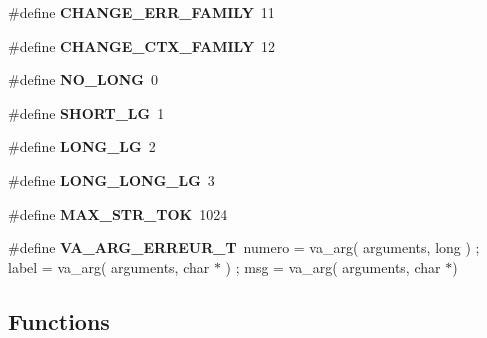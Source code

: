 \begin{CompactItemize}
\item 
\#define {\bf CHANGE\_\-ERR\_\-FAMILY}~11
\item 
\#define {\bf CHANGE\_\-CTX\_\-FAMILY}~12
\item 
\#define {\bf NO\_\-LONG}~0
\item 
\#define {\bf SHORT\_\-LG}~1
\item 
\#define {\bf LONG\_\-LG}~2
\item 
\#define {\bf LONG\_\-LONG\_\-LG}~3
\item 
\#define {\bf MAX\_\-STR\_\-TOK}~1024
\item 
\#define {\bf VA\_\-ARG\_\-ERREUR\_\-T}~numero = va\_\-arg( arguments, long ) ; label  = va\_\-arg( arguments, char $\ast$ ) ; msg    = va\_\-arg( arguments, char $\ast$)
\end{CompactItemize}
\subsection*{Functions}
